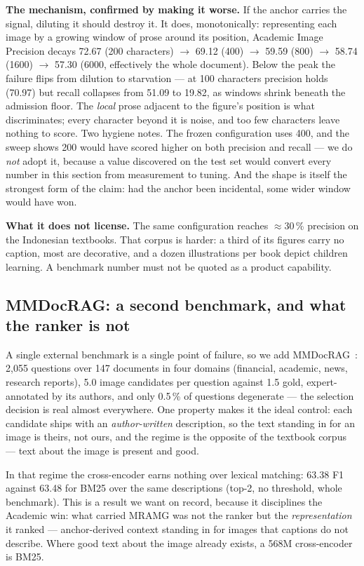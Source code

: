 \documentclass[journal]{IEEEtran}
\begin{document}
\textbf{The mechanism, confirmed by making it worse.} If the anchor carries the
signal, diluting it should destroy it. It does, monotonically: representing
each image by a growing window of prose around its position, Academic Image
Precision decays 72.67 (200 characters) $\to$ 69.12 (400) $\to$ 59.59 (800)
$\to$ 58.74 (1600) $\to$ 57.30 (6000, effectively the whole document). Below
the peak the failure flips from dilution to starvation --- at 100 characters
precision holds (70.97) but recall collapses from 51.09 to 19.82, as windows
shrink beneath the admission floor. The \emph{local} prose adjacent to the
figure's position is what discriminates; every character beyond it is noise,
and too few characters leave nothing to score. Two hygiene notes. The frozen
configuration uses 400, and the sweep shows 200 would have scored higher on
both precision and recall --- we do \emph{not} adopt it, because a value
discovered on the test set would convert every number in this section from
measurement to tuning. And the shape is itself the strongest form of the claim:
had the anchor been incidental, some wider window would have won.

\textbf{What it does not license.} The same configuration reaches $\approx$30\,\%
precision on the Indonesian textbooks. That corpus is harder: a third of its
figures carry no caption, most are decorative, and a dozen illustrations per book
depict children learning. A benchmark number must not be quoted as a product
capability.

\subsection{MMDocRAG: a second benchmark, and what the ranker is not}
\label{sec:mmdocrag}

A single external benchmark is a single point of failure, so we add
MMDocRAG~\cite{mmdocrag}: 2{,}055 questions over 147 documents in four domains
(financial, academic, news, research reports), 5.0 image candidates per question
against 1.5 gold, expert-annotated by its authors, and only 0.5\,\% of questions
degenerate --- the selection decision is real almost everywhere. One property
makes it the ideal control: each candidate ships with an \emph{author-written}
description, so the text standing in for an image is theirs, not ours, and the
regime is the opposite of the textbook corpus --- text about the image is
present and good.

In that regime the cross-encoder earns nothing over lexical matching: 63.38 F1
against 63.48 for BM25 over the same descriptions (top-2, no threshold, whole
benchmark). This is a result we want on record, because it disciplines the
Academic win: what carried MRAMG was not the ranker but the
\emph{representation} it ranked --- anchor-derived context standing in for
images that captions do not describe. Where good text about the image already
exists, a 568M cross-encoder is BM25.
\end{document}
